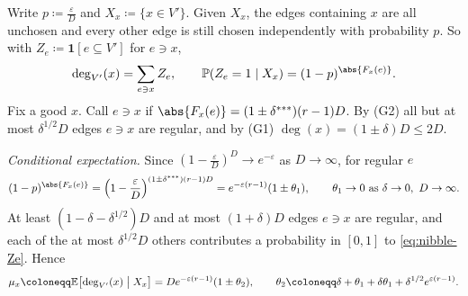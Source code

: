 Write \(p \coloneqq \frac{\varepsilon}{D}\) and \(X_{x} \coloneqq \{x \in V'\}\). Given \(X_{x}\), the edges containing \(x\) are all unchosen and every other edge is still chosen independently with probability \(p\). So with \(Z_{e} \coloneqq \mathbf{1}[e \subseteq V']\) for \(e \ni x\),
\begin{equation}\label{eq:nibble-Ze}
    \deg_{V'}(x) = \sum_{e \ni x} Z_{e},
    \qquad
    \mathbb{P}(Z_{e} = 1 \mid X_{x}) = (1 - p)^{\abs{F_{x}(e)}} .
\end{equation}
Fix a good \(x\). Call \(e \ni x\)  if \(\abs{F_{x}(e)} = (1 \pm \delta^{***})(r-1)D\). By (G2) all but at most \(\delta^{1/2} D\) edges \(e \ni x\) are regular, and by (G1) \(\deg(x) = (1 \pm \delta) D \le 2D\).

\emph{Conditional expectation.} Since \((1 - \frac{\varepsilon}{D})^{D} \to e^{-\varepsilon}\) as \(D \to \infty\), for regular \(e\)
\[
    (1 - p)^{\abs{F_{x}(e)}} = \Bigl( 1 - \frac{\varepsilon}{D} \Bigr)^{(1 \pm \delta^{***})(r-1)D} = e^{-\varepsilon(r-1)} (1 \pm \theta_{1}),
    \qquad \theta_{1} \to 0 \text{ as } \delta \to 0,\ D \to \infty .
\]
At least \((1 - \delta - \delta^{1/2})D\) and at most \((1 + \delta)D\) edges \(e \ni x\) are regular, and each of the at most \(\delta^{1/2} D\) others contributes a probability in \([0, 1]\) to \eqref{eq:nibble-Ze}. Hence
\[
    \mu_{x} \coloneqq \mathbb{E}\bigl[ \deg_{V'}(x) \bigm| X_{x} \bigr] = D e^{-\varepsilon(r-1)} (1 \pm \theta_{2}),
    \qquad
    \theta_{2} \coloneqq \delta + \theta_{1} + \delta\theta_{1} + \delta^{1/2} e^{\varepsilon(r-1)} .
\]

